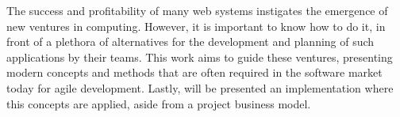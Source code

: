 \begin{foreignabstract}

The success and profitability of many web systems instigates the emergence of new ventures in computing. However, it is important to know how to do it, in front of a plethora of alternatives for the development and planning of such applications by their teams. This work aims to guide these ventures, presenting modern concepts and methods that are often required in the software market today for agile development. Lastly, will be presented an implementation where this concepts are applied, aside from a project business model.

\end{foreignabstract}

